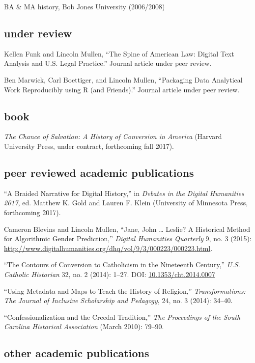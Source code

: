 \documentclass[11pt]{article}
\begin{document}
BA \& MA history, Bob Jones University (2006/2008)

\subsection{under review}\label{in-progress}

Kellen Funk and Lincoln Mullen, ``The Spine of American Law: Digital Text 
Analysis and U.S. Legal Practice.'' Journal article under peer review.

Ben Marwick, Carl Boettiger, and Lincoln Mullen, ``Packaging Data Analytical 
Work Reproducibly using R (and Friends).'' Journal article under peer review.

\subsection{book}\label{books}

\emph{The Chance of Salvation: A History of Conversion in America} (Harvard 
University Press, under contract, forthcoming fall 2017).

\subsection{peer reviewed academic publications}\label{peer-reviewed}

``A Braided Narrative for Digital History,'' in \emph{Debates in the Digital 
  Humanities 2017}, ed. Matthew K. Gold and Lauren F. Klein (University of 
Minnesota Press, forthcoming 2017).

Cameron Blevins and Lincoln Mullen, ``Jane, John \ldots{} Leslie? A
Historical Method for Algorithmic Gender Prediction,'' \emph{Digital
  Humanities Quarterly} 9, no. 3 (2015): 
\url{http://www.digitalhumanities.org/dhq/vol/9/3/000223/000223.html}.

``The Contours of Conversion to Catholicism in the Nineteenth Century,''
\emph{U.S. Catholic Historian} 32, no. 2 (2014): 1--27. DOI:
\href{http://dx.doi.org/10.1353/cht.2014.0007}{10.1353/cht.2014.0007}

``Using Metadata and Maps to Teach the History of Religion,''
\emph{Transformations: The Journal of Inclusive Scholarship and
  Pedagogy}, 24, no. 3 (2014): 34--40.

``Confessionalization and the Creedal Tradition,'' \emph{The Proceedings
  of the South Carolina Historical Association} (March 2010): 79--90.

\subsection{other academic publications}\label{other-academic}
\end{document}
